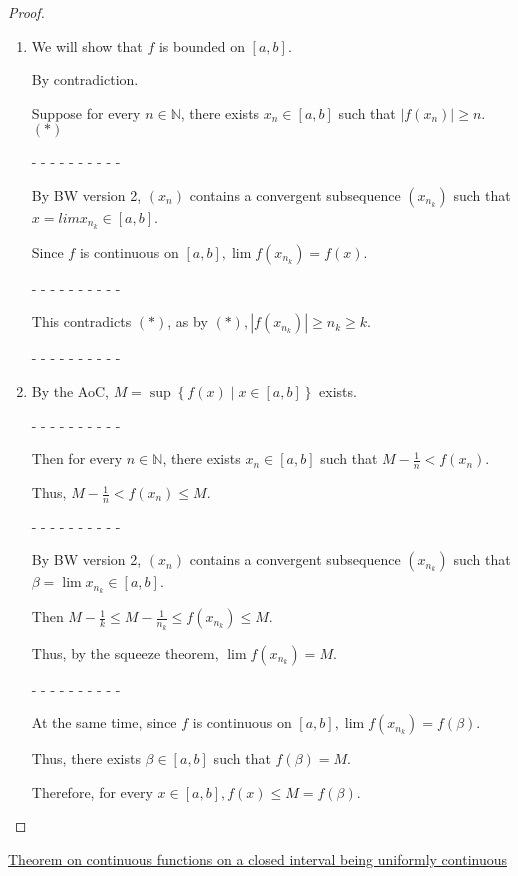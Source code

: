 \documentclass[12pt]{article}
\newcommand{\NN}{\mathbb{N}}
\newcommand\set[1]{\left\lbrace #1 \right\rbrace} %
\newcommand\abs[1]{\left| #1 \right|} %
\begin{document}
\dotfill

\begin{proof}
$ $

\begin{enumerate}
\item We will show that $f$ is bounded on $[a, b]$.

By contradiction.

Suppose for every $n \in \NN$, there exists $x_n \in [a, b]$ such that $\abs{f(x_n)} \ge n$. $(\ast)$

- - - - - - - - - -

By BW version 2, $(x_n)$ contains a convergent subsequence $(x_{n_k})$ such that $x = lim x_{n_k} \in [a, b]$.

Since $f$ is continuous on $[a, b], \lim f(x_{n_k}) = f(x)$.

- - - - - - - - - -

This contradicts $(\ast)$, as by $(\ast), \abs{f(x_{n_k})} \ge n_k \ge k$.

- - - - - - - - - -

\item By the AoC, $M = \sup \set{f(x) \mid x \in [a, b]}$ exists.

- - - - - - - - - -

Then for every $n \in \NN$, there exists $x_n \in [a, b]$ such that $M - \frac{1}{n} < f(x_n)$.

Thus, $M - \frac{1}{n} < f(x_n) \le M$.

- - - - - - - - - -

By BW version 2, $(x_n)$ contains a convergent subsequence $(x_{n_k})$ such that $\beta = \lim x_{n_k} \in [a, b]$.

Then $M - \frac{1}{k} \le M - \frac{1}{n_k} \le f(x_{n_k}) \le M$.

Thus, by the squeeze theorem, $\lim f(x_{n_k}) = M$.

- - - - - - - - - -

At the same time, since $f$ is continuous on $[a, b], \lim f(x_{n_k}) = f(\beta)$.

Thus, there exists $\beta \in [a, b]$ such that $f(\beta) = M$.

Therefore, for every $x \in [a, b], f(x) \le M = f(\beta)$.
\end{enumerate}
\end{proof}

\pagebreak

\underline{Theorem on continuous functions on a closed interval being uniformly continuous}
\end{document}

